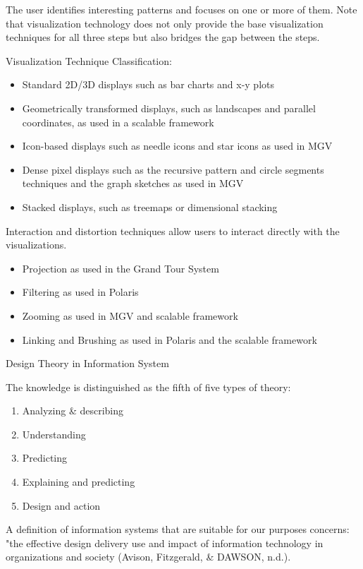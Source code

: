 \documentclass[print]{nuthesis}
\providecommand{\tightlist}{%
  \setlength{\itemsep}{0pt}\setlength{\parskip}{0pt}}
\begin{document}
The user identifies interesting patterns and focuses on one or more of them. Note that visualization technology does not only provide the base visualization techniques for all three steps but also bridges the gap between the steps.

Visualization Technique Classification:

\begin{itemize}
\tightlist
\item
  Standard 2D/3D displays such as bar charts and x-y plots
\item
  Geometrically transformed displays, such as landscapes and parallel coordinates, as used in a scalable framework
\item
  Icon-based displays such as needle icons and star icons as used in MGV
\item
  Dense pixel displays such as the recursive pattern and circle segments techniques and the graph sketches as used in MGV
\item
  Stacked displays, such as treemaps or dimensional stacking
\end{itemize}

Interaction and distortion techniques allow users to interact directly with the visualizations.

\begin{itemize}
\tightlist
\item
  Projection as used in the Grand Tour System
\item
  Filtering as used in Polaris
\item
  Zooming as used in MGV and scalable framework
\item
  Linking and Brushing as used in Polaris and the scalable framework
\end{itemize}

Design Theory in Information System

The knowledge is distinguished as the fifth of five types of theory:

\begin{enumerate}
\def\labelenumi{\arabic{enumi}.}
\tightlist
\item
  Analyzing \& describing
\item
  Understanding
\item
  Predicting
\item
  Explaining and predicting
\item
  Design and action
\end{enumerate}

A definition of information systems that are suitable for our purposes concerns: "the effective design delivery use and impact of information technology in organizations and society (Avison, Fitzgerald, \& DAWSON, n.d.).
\end{document}
